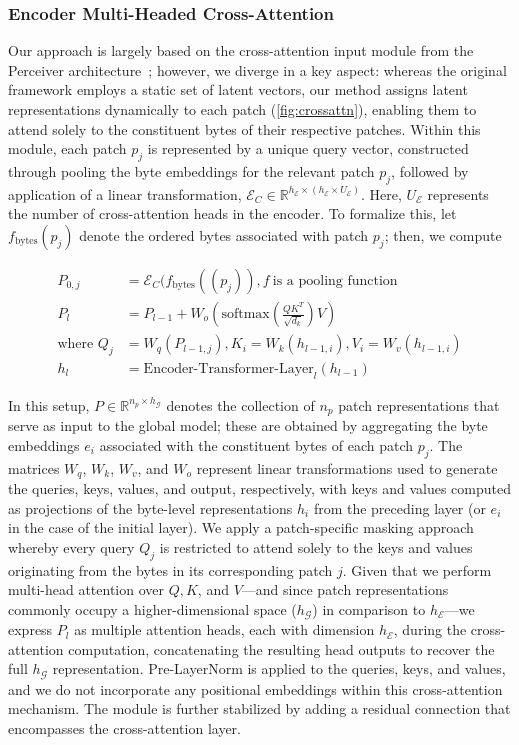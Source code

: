 \subsubsection{Encoder Multi-Headed Cross-Attention}
\label{sec:enc-cross-attn}
Our approach is largely based on the cross-attention input module from the Perceiver architecture~\citep{jaegle2021perceiver}; however, we diverge in a key aspect: whereas the original framework employs a static set of latent vectors, our method assigns latent representations dynamically to each patch (\autoref{fig:crossattn}), enabling them to attend solely to the constituent bytes of their respective patches. Within this module, each patch $p_j$ is represented by a unique query vector, constructed through pooling the byte embeddings for the relevant patch $p_j$, followed by application of a linear transformation, $\mathcal{E}_{C} \in \mathbb{R}^{h_{\mathcal{E}} \times (h_{\mathcal{E}} \times U_{\mathcal{E}})}$. Here, $U_{\mathcal{E}}$ represents the number of cross-attention heads in the encoder. To formalize this, let $f_{\text{bytes}}(p_j)$ denote the ordered bytes associated with patch $p_j$; then, we compute

\begin{align}
P_{0,j} &= \mathcal{E}_{C}(f_\text{bytes}((p_j)), f~ \text{is a pooling function} \\
P_l &= P_{l-1} + W_o\left(\text{softmax}\left(\frac{QK^T}{\sqrt{d_k}}\right)V\right) \\
\text{where } Q_j &= W_q(P_{l-1,j}), K_i = W_k(h_{l-1,i}), V_i = W_v(h_{l-1,i}) \\
h_l &= \text{Encoder-Transformer-Layer}_l(h_{l-1})
\end{align}

In this setup, $P \in \mathbb{R}^{n_p \times h_{\mathcal{G}}}$ denotes the collection of $n_p$ patch representations that serve as input to the global model; these are obtained by aggregating the byte embeddings $e_i$ associated with the constituent bytes of each patch $p_j$. The matrices $W_q$, $W_k$, $W_v$, and $W_o$ represent linear transformations used to generate the queries, keys, values, and output, respectively, with keys and values computed as projections of the byte-level representations $h_i$ from the preceding layer (or $e_i$ in the case of the initial layer). We apply a patch-specific masking approach whereby every query $Q_j$ is restricted to attend solely to the keys and values originating from the bytes in its corresponding patch $j$. Given that we perform multi-head attention over $Q, K$, and $V$—and since patch representations commonly occupy a higher-dimensional space ($h_{\mathcal{G}}$) in comparison to $h_{\mathcal{E}}$—we express $P_l$ as multiple attention heads, each with dimension $h_{\mathcal{E}}$, during the cross-attention computation, concatenating the resulting head outputs to recover the full $h_{\mathcal{G}}$ representation. Pre-LayerNorm is applied to the queries, keys, and values, and we do not incorporate any positional embeddings within this cross-attention mechanism. The module is further stabilized by adding a residual connection that encompasses the cross-attention layer.

